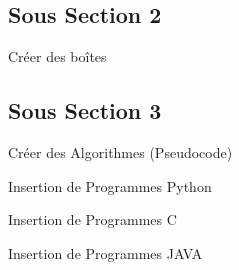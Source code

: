 \documentclass{libs/udl_format}
\begin{document}
\subsection{Sous Section 2}
\begin{frame}{Créer des boîtes}

    \pause


    \pause

\end{frame}

\subsection{Sous Section 3}
\begin{frame}{Créer des Algorithmes (Pseudocode)}
    \begin{algorithm}[H]
        \SetAlgoLined
        \LinesNumbered
         \caption{Exemple d'algorithme }
    \end{algorithm}
\end{frame}


\begin{frame}{Insertion de Programmes Python }
    \lstset{language=Python}
    
\end{frame}

\begin{frame}{Insertion de Programmes C }
    
\end{frame}

\begin{frame}{Insertion de Programmes JAVA}
    
\end{frame}
\end{document}
